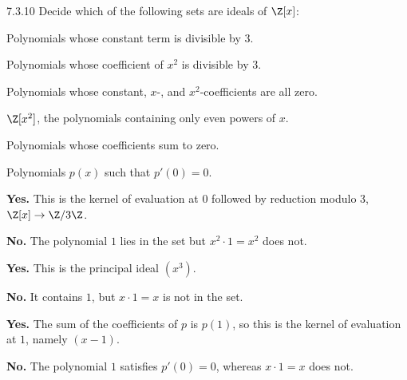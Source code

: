 \documentclass[11pt,oneside]{article}
\begin{document}
\begin{exercise}{7.3.10}
Decide which of the following sets are ideals of $\Z[x]$:
\begin{exercisesubparts}
\item Polynomials whose constant term is divisible by $3$.
\item Polynomials whose coefficient of $x^2$ is divisible by $3$.
\item Polynomials whose constant, $x$-, and $x^2$-coefficients are all zero.
\item $\Z[x^2]$, the polynomials containing only even powers of $x$.
\item Polynomials whose coefficients sum to zero.
\item Polynomials $p(x)$ such that $p'(0)=0$.
\end{exercisesubparts}
\end{exercise}
\begin{solution}
\begin{exercisesubparts}
\item \textbf{Yes.} This is the kernel of evaluation at $0$ followed by reduction modulo $3$, $\Z[x]\to\Z/3\Z$.
\item \textbf{No.} The polynomial $1$ lies in the set but $x^2\cdot1=x^2$ does not.
\item \textbf{Yes.} This is the principal ideal $(x^3)$.
\item \textbf{No.} It contains $1$, but $x\cdot1=x$ is not in the set.
\item \textbf{Yes.} The sum of the coefficients of $p$ is $p(1)$, so this is the kernel of evaluation at $1$, namely $(x-1)$.
\item \textbf{No.} The polynomial $1$ satisfies $p'(0)=0$, whereas $x\cdot1=x$ does not.
\end{exercisesubparts}
\end{solution}
\end{document}
